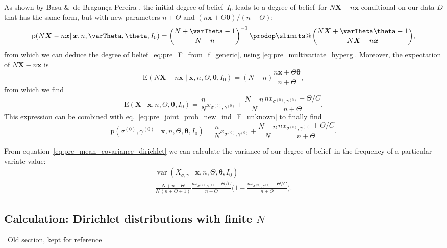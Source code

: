 \documentclass[\ifafour a4paper,12pt,\else a5paper,10pt,\fi%
onecolumn,oneside,article,%
british%
]{memoir}
\makeatletter
\theoremstyle{remark}
\theoremstyle{innote}
\def\prod{\DOTSI\prodop\slimits@}
\newcommand*{\citey}{\parencites*}
\newcommand*{\amp}{\&}
\newcommand*{\pf}{\mathrm{p}}%
\renewcommand*{\|}{\mathpunct{|}}
\newcommand*{\sect}{\S}%
\newcommand*{\eqn}{eq.}%
\newcommand*{\tprod}{\mathop{\textstyle\prod}\nolimits}
\newcommand*{\E}{\mathrm{E}}
\newcommand*{\puzzle}{\maltese}
\newcommand{\mynote}[1]{ {\color{notecolour}\puzzle\ #1}}
\DeclareMathOperator{\var}{var}
\newcommand*{\dob}{degree of belief}
\newcommand*{\yD}{D}
\newcommand*{\yprod}{\tprod}
\newcommand*{\ys}{\sigma}
\newcommand*{\yg}{\gamma}
\newcommand*{\ysi}[1]{\ys^{(#1)}}
\newcommand*{\ygi}[1]{\yg^{(#1)}}
\newcommand*{\yso}{\ysi{0}}
\newcommand*{\ygo}{\ygi{0}}
\newcommand*{\yF}{\bm{X}}
\newcommand*{\yf}{\bm{x}}
\newcommand*{\yIo}{I_{0}}
\newcommand*{\yA}{\varTheta}
\newcommand*{\ya}{\bm{\theta}}
\makeatother
\begin{document}
As shown by Basu \amp\ de Bragan\c{c}a Pereira \citey[\sect~4,
Theorem~2]{basuetal1982}, the initial \dob\ $\yIo$ leads to a \dob\ for
$N\yF-n\yf$ conditional on our data $\yD$ that has the same form, but with
new parameters $n+\yA$ and $(n\yf+\yA\ya)/(n+\yA)$:
\begin{equation}
  \label{eq:pre_dirichlet_posterior_X}
  \pf(N\yF -n\yf \| \yf, n, \yA, \ya,\yIo) =
  \binom{N+\yA-1}{N-n}^{-1} \yprod\binom{N\yF+\yA\ya-1}{N\yF-n\yf},
\end{equation}
from which we can deduce the \dob~\eqref{eq:pre_F_from_f_generic}, using
\eqref{eq:pre_multivariate_hyperg}. Moreover, the expectation of $N\yF-n\yf$ is
\citey[\sect~3]{basuetal1982}
\begin{equation}
  \label{eq:pre_dirichlet_posterior_expectation}
  \E(N\yF -n\yf \| \yf, n, \yA, \ya,\yIo) =
  (N-n) \frac{n\yf+\yA\ya}{n+\yA},
\end{equation}
from which we find
\begin{equation}
    \label{eq:pre_expect_freq_dirichlet_prior_final}
    \E(\yF \| \yf, n,\yA,\ya, \yIo)  =
    \frac{n}{N}x_{\yso, \ygo} + \frac{N-n}{N}
\frac{n x_{\yso, \ygo}+\yA/C}{n+\yA}.
\end{equation}
This expression can be combined with
\eqn~\eqref{eq:pre_joint_prob_new_ind_F_unknown} to finally find
\begin{equation}
    \label{eq:pre_joint_prob_new_ind_full_dirichlet_prior_final}
    \pf(\yso, \ygo \| \yf, n,\yA,\ya, \yIo)  =
    \frac{n}{N}x_{\yso, \ygo} + \frac{N-n}{N}
\frac{n x_{\yso, \ygo}+\yA/C}{n+\yA}.
\end{equation}

From equation~\eqref{eq:pre_mean_covariance_dirichlet} we can calculate the
variance of our \dob\ in the frequency of a particular variate value:
\begin{multline}
  \label{eq:pre_variance_single_gene_dirichlet}
  \var(X_{\ys,\yg} \| \yf, n,\yA,\ya, \yIo)  ={}\\
  \frac{N+n+\yA}{N\,(n+\yA+1)}
  \frac{n x_{\yso, \ygo}+\yA/C}{n+\yA}
  \Biggl(1- \frac{n x_{\yso, \ygo}+\yA/C}{n+\yA} \Biggr).
\end{multline}


\subsection*{Calculation: Dirichlet distributions with finite $N$}

\mynote{Old section, kept for reference}
\end{document}
